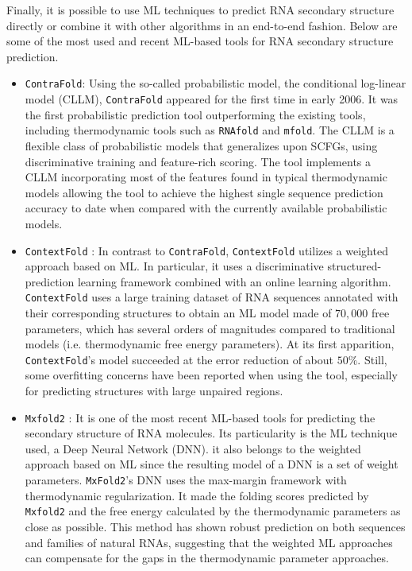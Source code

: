 Finally, it is possible to use ML techniques to predict RNA secondary structure directly or combine it with other algorithms in an end-to-end fashion. Below are some of the most used and recent ML-based tools for RNA secondary structure prediction.
\begin{itemize}
	\item \texttt{ContraFold}\cite{do2006contrafold}: Using the so-called probabilistic model, the conditional log-linear model (CLLM), \texttt{ContraFold} appeared for the first time in early 2006. It was the first probabilistic prediction tool outperforming the existing tools, including thermodynamic tools such as \texttt{RNAfold} and \texttt{mfold}. The CLLM is a flexible class of probabilistic models that generalizes upon SCFGs, using discriminative training and feature-rich scoring. The tool implements a CLLM incorporating most of the features found in typical thermodynamic models allowing the tool to achieve the highest single sequence prediction accuracy to date when compared with the currently available probabilistic models.
	\item \texttt{ContextFold} \cite{zakov2011rich}: In contrast to \texttt{ContraFold}, \texttt{ContextFold} utilizes a weighted approach based on ML. In particular, it uses a discriminative structured-prediction learning framework combined with an online learning algorithm. \texttt{ContextFold} uses a large training dataset of RNA sequences annotated with their corresponding structures to obtain an ML model made of $70,000$ free parameters, which has several orders of magnitudes compared to traditional models (i.e. thermodynamic free energy parameters). At its first apparition, \texttt{ContextFold}'s model succeeded at the error reduction of about $50\%$. Still, some overfitting concerns have been reported when using the tool, especially for predicting structures with large unpaired regions.  
	\item \texttt{Mxfold2}  \cite{sato2021rna}: It is one of the most recent ML-based tools for predicting the secondary structure of RNA molecules. Its particularity is the ML technique used, a Deep Neural Network (DNN). it also belongs to the weighted approach based on ML since the resulting model of a DNN is a set of weight parameters. \texttt{MxFold2}'s DNN uses the max-margin framework with thermodynamic regularization. It made the folding scores predicted by \texttt{Mxfold2} and the free energy calculated by the thermodynamic parameters as close as possible. This method has shown robust prediction on both sequences and families of natural RNAs, suggesting that the weighted ML approaches can compensate for the gaps in the thermodynamic parameter approaches. 
\end{itemize}

